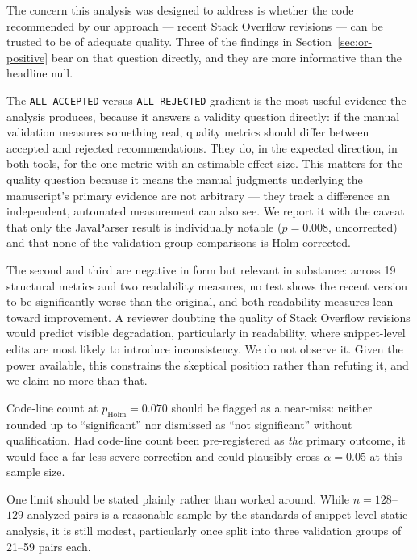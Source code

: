 The concern this analysis was designed to address is whether the code recommended by our approach --- recent Stack Overflow revisions --- can be trusted to be of adequate quality.
Three of the findings in Section~\ref{sec:or-positive} bear on that question directly, and they are more informative than the headline null.

The \texttt{ALL\_ACCEPTED} versus \texttt{ALL\_REJECTED} gradient is the most useful evidence the analysis produces, because it answers a validity question directly: if the manual validation measures something real, quality metrics should differ between accepted and rejected recommendations.
They do, in the expected direction, in both tools, for the one metric with an estimable effect size.
This matters for the quality question because it means the manual judgments underlying the manuscript's primary evidence are not arbitrary --- they track a difference an independent, automated measurement can also see.
We report it with the caveat that only the JavaParser result is individually notable ($p=0.008$, uncorrected) and that none of the validation-group comparisons is Holm-corrected.

The second and third are negative in form but relevant in substance: across 19 structural metrics and two readability measures, no test shows the recent version to be significantly worse than the original, and both readability measures lean toward improvement.
A reviewer doubting the quality of Stack Overflow revisions would predict visible degradation, particularly in readability, where snippet-level edits are most likely to introduce inconsistency.
We do not observe it.
Given the power available, this constrains the skeptical position rather than refuting it, and we claim no more than that.

Code-line count at $p_{\text{Holm}}=0.070$ should be flagged as a near-miss: neither rounded up to ``significant'' nor dismissed as ``not significant'' without qualification.
Had code-line count been pre-registered as \emph{the} primary outcome, it would face a far less severe correction and could plausibly cross $\alpha=0.05$ at this sample size.

One limit should be stated plainly rather than worked around.
While $n=128$--$129$ analyzed pairs is a reasonable sample by the standards of snippet-level static analysis, it is still modest, particularly once split into three validation groups of 21--59 pairs each.


